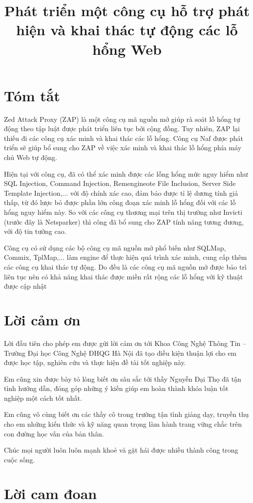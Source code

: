\documentclass[12pt,a4paper]{report}
\title{Phát triển một công cụ hỗ trợ phát hiện và khai thác tự động các lỗ hổng Web}
\begin{document}

\clearpage{}

\chapter*{Tóm tắt}

Zed Attack Proxy (ZAP) là một công cụ mã nguồn mở giúp rà soát lỗ hổng tự động theo tập luật được phát triển liên tục bởi cộng đồng. Tuy nhiên, ZAP lại thiếu đi các công cụ xác minh và khai thác các lỗ hổng. Công cụ Naf được phát triển sẽ giúp bổ sung cho ZAP về việc xác minh và khai thác lỗ hổng phía máy chủ Web tự động.

Hiện tại với công cụ, đã có thể xác minh được các lỗng hổng mức nguy hiểm như SQL Injection, Command Injection, Remengineote File Inclusion, Server Side Template Injection,... với độ chính xác cao, đảm bảo được tỉ lệ dương tính giả thấp, từ đó lược bỏ được phần lớn công đoạn xác minh lỗ hổng đối với các lỗ hổng nguy hiểm này. So với các công cụ thương mại trên thị trường như Invicti (trước đây là Netsparker) thì công đã bổ sung cho ZAP tính năng tương đương, với độ tin tưởng cao.

Công cụ có sử dụng các bộ công cụ mã nguồn mở phổ biến như SQLMap, Commix, TplMap,... làm engine để thực hiện quá trình xác minh, cung cấp thêm các công cụ khai thác tự động. Do đều là các công cụ mã nguồn mở được bảo trì liên tục nên có khả năng khai thác được miền rất rộng các lỗ hổng với kỹ thuật được cập nhật

\chapter*{Lời cảm ơn}

Lời đầu tiên cho phép em được gửi lời cảm ơn tới Khoa Công Nghệ Thông Tin – Trường Đại học Công Nghệ ĐHQG Hà Nội đã tạo điều kiện thuận lợi cho em được học tập, nghiên cứu và thực hiện đề tài tốt nghiệp này.

Em cũng xin được bày tỏ lòng biết ơn sâu sắc tới thầy Nguyễn Đại Thọ đã tận tình hướng dẫn, đóng góp những ý kiến giúp em hoàn thành khóa luận tốt nghiệp một cách tốt nhất.

Em cũng vô cùng biết ơn các thầy cô trong trường tận tình giảng dạy, truyền thụ cho em những kiến thức và kỹ năng quan trọng làm hành trang vững chắc trên con đường học vấn của bản thân.

Chúc mọi người luôn luôn mạnh khoẻ và gặt hái được nhiều thành công trong cuộc sống.

\chapter*{Lời cam đoan}
\end{document}

